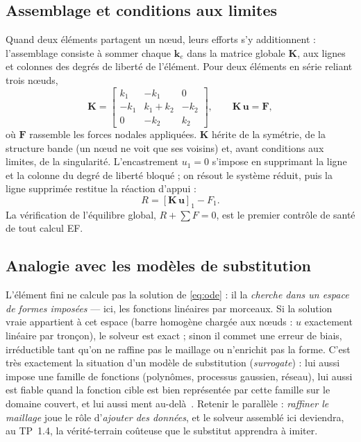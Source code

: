 \documentclass[10pt,journal]{IEEEtran}
\begin{document}
\subsection{Assemblage et conditions aux limites}
Quand deux éléments partagent un n\oe{}ud, leurs efforts s'y additionnent : l'assemblage consiste à sommer chaque $\mathbf{k}_e$ dans la matrice globale $\mathbf{K}$, aux lignes et colonnes des degrés de liberté de l'élément. Pour deux éléments en série reliant trois n\oe{}uds,
\begin{equation}
\mathbf{K} =
\begin{bmatrix}
k_1 & -k_1 & 0 \\
-k_1 & k_1+k_2 & -k_2 \\
0 & -k_2 & k_2
\end{bmatrix},
\qquad
\mathbf{K}\,\mathbf{u} = \mathbf{F},
\label{eq:assemblage}
\end{equation}
où $\mathbf{F}$ rassemble les forces nodales appliquées. $\mathbf{K}$ hérite de la symétrie, de la structure bande (un n\oe{}ud ne \og voit\fg{} que ses voisins) et, avant conditions aux limites, de la singularité. L'encastrement $u_1=0$ s'impose en supprimant la ligne et la colonne du degré de liberté bloqué ; on résout le système réduit, puis la ligne supprimée restitue la réaction d'appui :
\begin{equation}
R = \left[\mathbf{K}\,\mathbf{u}\right]_1 - F_1 .
\label{eq:reaction}
\end{equation}
La vérification de l'équilibre global, $R + \sum F = 0$, est le premier contrôle de santé de tout calcul EF.

\subsection{Analogie avec les modèles de substitution}
L'élément fini ne \og calcule\fg{} pas la solution de \eqref{eq:ode} : il la \emph{cherche dans un espace de formes imposées} --- ici, les fonctions linéaires par morceaux. Si la solution vraie appartient à cet espace (barre homogène chargée aux n\oe{}uds : $u$ exactement linéaire par tronçon), le solveur est exact ; sinon il commet une erreur de biais, irréductible tant qu'on ne raffine pas le maillage ou n'enrichit pas la forme. C'est très exactement la situation d'un modèle de substitution (\emph{surrogate}) : lui aussi impose une famille de fonctions (polynômes, processus gaussien, réseau), lui aussi est fiable quand la fonction cible est bien représentée par cette famille sur le domaine couvert, et lui aussi ment au-delà~\cite{forrester}. Retenir le parallèle : \emph{raffiner le maillage} joue le rôle d'\emph{ajouter des données}, et le solveur assemblé ici deviendra, au TP~1.4, la vérité-terrain coûteuse que le substitut apprendra à imiter.
\end{document}
